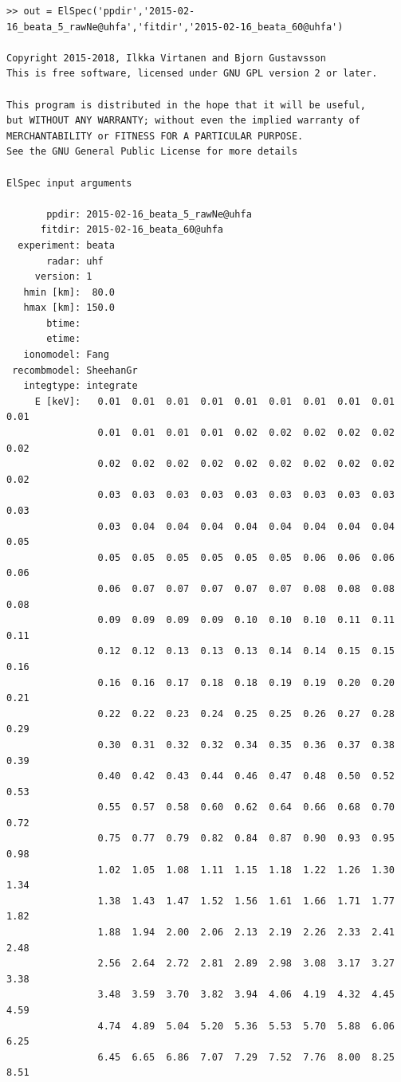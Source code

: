 \documentclass[12pt,a4paper]{report}
\begin{document}
\begin{lstlisting}[style=myMATLABsmall]
>> out = ElSpec('ppdir','2015-02-16_beata_5_rawNe@uhfa','fitdir','2015-02-16_beata_60@uhfa')
  
Copyright 2015-2018, Ilkka Virtanen and Bjorn Gustavsson
This is free software, licensed under GNU GPL version 2 or later.
  
This program is distributed in the hope that it will be useful, 
but WITHOUT ANY WARRANTY; without even the implied warranty of 
MERCHANTABILITY or FITNESS FOR A PARTICULAR PURPOSE.
See the GNU General Public License for more details

ElSpec input arguments

       ppdir: 2015-02-16_beata_5_rawNe@uhfa
      fitdir: 2015-02-16_beata_60@uhfa
  experiment: beata
       radar: uhf
     version: 1
   hmin [km]:  80.0
   hmax [km]: 150.0
       btime: 
       etime: 
   ionomodel: Fang
 recombmodel: SheehanGr
   integtype: integrate
     E [keV]:   0.01  0.01  0.01  0.01  0.01  0.01  0.01  0.01  0.01  0.01
                0.01  0.01  0.01  0.01  0.02  0.02  0.02  0.02  0.02  0.02
                0.02  0.02  0.02  0.02  0.02  0.02  0.02  0.02  0.02  0.02
                0.03  0.03  0.03  0.03  0.03  0.03  0.03  0.03  0.03  0.03
                0.03  0.04  0.04  0.04  0.04  0.04  0.04  0.04  0.04  0.05
                0.05  0.05  0.05  0.05  0.05  0.05  0.06  0.06  0.06  0.06
                0.06  0.07  0.07  0.07  0.07  0.07  0.08  0.08  0.08  0.08
                0.09  0.09  0.09  0.09  0.10  0.10  0.10  0.11  0.11  0.11
                0.12  0.12  0.13  0.13  0.13  0.14  0.14  0.15  0.15  0.16
                0.16  0.16  0.17  0.18  0.18  0.19  0.19  0.20  0.20  0.21
                0.22  0.22  0.23  0.24  0.25  0.25  0.26  0.27  0.28  0.29
                0.30  0.31  0.32  0.32  0.34  0.35  0.36  0.37  0.38  0.39
                0.40  0.42  0.43  0.44  0.46  0.47  0.48  0.50  0.52  0.53
                0.55  0.57  0.58  0.60  0.62  0.64  0.66  0.68  0.70  0.72
                0.75  0.77  0.79  0.82  0.84  0.87  0.90  0.93  0.95  0.98
                1.02  1.05  1.08  1.11  1.15  1.18  1.22  1.26  1.30  1.34
                1.38  1.43  1.47  1.52  1.56  1.61  1.66  1.71  1.77  1.82
                1.88  1.94  2.00  2.06  2.13  2.19  2.26  2.33  2.41  2.48
                2.56  2.64  2.72  2.81  2.89  2.98  3.08  3.17  3.27  3.38
                3.48  3.59  3.70  3.82  3.94  4.06  4.19  4.32  4.45  4.59
                4.74  4.89  5.04  5.20  5.36  5.53  5.70  5.88  6.06  6.25
                6.45  6.65  6.86  7.07  7.29  7.52  7.76  8.00  8.25  8.51

\end{lstlisting}
\end{document}
